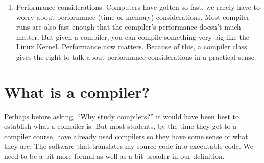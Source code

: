 \documentclass[letterpaper,12pt,openany,reqno]{book}%
\begin{document}
\begin{enumerate}
\item Performance considerations. Computers have gotten so fast, we rarely have to worry about performance (time or memory) considerations. Most compiler runs are also fast enough that the compiler's performance doesn't much matter. But given a compiler, you can compile something very big like the Linux Kernel. Performance now matters. Because of this, a compiler class gives the right to talk about performance considerations in a practical sense.

\end{enumerate}

\section{What is a compiler?}
Perhaps before asking, ``Why study compilers?'' it would have been best to establish what a compiler is. But most students, by the time they get to a compiler course, have already used compilers so they have some sense of what they are: The software that translates my source code into executable code. We need to be a bit more formal as well as a bit broader in our definition.
\end{document}
